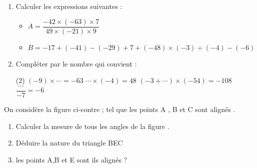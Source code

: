 \documentclass[a4paper,12pt]{article}
\begin{document}
\devoir[ds=false,num=3 ,niv=1 , date=10/01/2023, Rdate=17/01/2023, prv=true]

\begin{exo}
\begin{enumerate}
\item Calculer les expressions suivantes :
\begin{itemize}
\item \(A= \dfrac{-42\times (-63)\times 7}{49\times (-21)\times 9}\)
\item \( B=-17+(-41)-(-29)+7+(-48)\times (-3)\div (-4)-(-6)\)
\end{itemize}

\item Compléter par le nombre qui convient :
\begin{tasks}[style=itemize](2)
\task \( (-9)\times \cdots = -63 \)
\task \( \cdots \times (-4) = 48\)
\task \( (-3+ \cdots )\times (-54)= -108\)
\task \(\dfrac{\cdots}{-7}=-6\)
\end{tasks}

\end{enumerate}
\end{exo}

\begin{exo}
\begin{minipage}{.6\linewidth}
On considère la figure ci-contre ; tel que les points A , B et C sont alignés .
\begin{enumerate}
\item Calculer la mesure de tous les angles de la figure .
\item Déduire la nature du triangle BEC
\item les points A,B et E sont ils alignés ?
\end{enumerate}
\end{minipage}
\begin{minipage}{.4\linewidth}
\end{minipage}
\end{exo}
\end{document}
